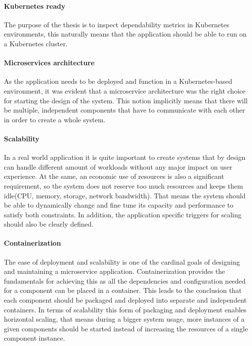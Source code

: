 \paragraph{Kubernetes ready}The purpose of the thesis is to inspect dependability metrics in Kubernetes environments, this naturally means that the application should be able to run on a Kubernetes cluster.

\paragraph{Microservices architecture}As the application needs to be deployed and function in a Kubernetes-based environment, it was evident that a microservice architecture was the right choice for starting the design of the system. This notion implicitly means that there will be multiple, independent components that have to communicate with each other in order to create a whole system.

\paragraph{Scalability}In a real world application it is quite important to create systems that by design can handle different amount of workloads without any major impact on user experience. At the same, an economic use of resources is also a significant requirement, so the system does not reserve too much resources and keeps them idle(\eg CPU, memory, storage, network bandwidth). That means the system should be able to dynamically change and fine tune its capacity and performance to satisfy both constraints. In addition, the application specific triggers for scaling should also be clearly defined.

\paragraph{Containerization}The ease of deployment and scalability is one of the cardinal goals of designing and maintaining a microservice application. Containerization provides the fundamentals for achieving this as all the dependencies and configuration needed for a component can be placed in a container. This leads to the conclusion that each component should be packaged and deployed into separate and independent containers.  In terms of scalability this form of packaging and deployment enables horizontal scaling, that means \eg during a bigger system usage, more instances of a given components should be started instead of increasing the resources of a single component instance.


